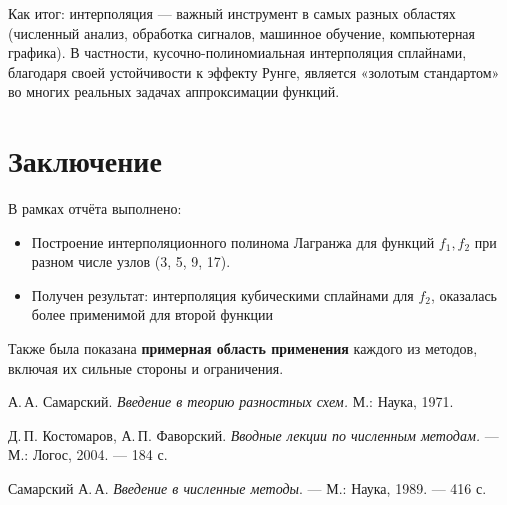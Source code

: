 \documentclass[a4paper, fleqn]{report}
\begin{document}
\noindent Как итог: интерполяция --- важный инструмент в самых разных областях (численный анализ, обработка сигналов, машинное обучение, компьютерная графика). В частности, кусочно-полиномиальная интерполяция сплайнами, благодаря своей устойчивости к эффекту Рунге, является «золотым стандартом» во многих реальных задачах аппроксимации функций.

\bigskip

\chapter*{Заключение}

В рамках отчёта выполнено:
\begin{itemize}
    \item Построение интерполяционного полинома Лагранжа для функций \(f_1, f_2\) при разном числе узлов (3, 5, 9, 17).
    \item Получен результат: интерполяция кубическими сплайнами для \(f_2\), оказалась более применимой для второй функции

\end{itemize}

\vspace{10pt}

\noindent Также была показана \textbf{примерная область применения} каждого из методов, включая их сильные стороны и ограничения.

\begin{thebibliography}{9}
\renewcommand{\bibname}{Литература}
А.\,А. Самарский. \textit{Введение в теорию разностных схем.} М.: Наука, 1971.

Д.\,П. Костомаров, А.\,П. Фаворский. \textit{Вводные лекции по численным методам.} — М.: Логос, 2004. — 184 с.

Самарский А.\,А. \textit{Введение в численные методы}. — М.: Наука, 1989. — 416 с.

\end{thebibliography}
\end{document}
